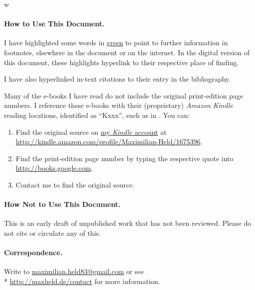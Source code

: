 w%
\paragraph{How to Use This Document.}
I have highlighted some words in \href{chap:how2}{green} to point to further information in footnotes, elsewhere in the document or on the internet.
In the digital version of this document, these highlights hyperlink to their respective place of finding.

I have also hyperlinked in-text citations to their entry in the bibliography.

Many of the e-books I have read do not include the original print-edition page numbers.
I reference these e-books with their (proprietary) \emph{Amazon Kindle \circledR} reading locations, identified as ``Kxxx'', such as in \citet[K50]{McCaffery2002}.
You can:

\begin{enumerate}
	\item Find the original source on \href{http://kindle.amazon.com/profile/Maximilian-Held/1675396}{my \emph{Kindle \circledR} account} at\\ \url{http://kindle.amazon.com/profile/Maximilian-Held/1675396}.

	\item Find the print-edition page number by typing the respective quote into \url{http://books.google.com}.

	\item Contact me to find the original source.
\end{enumerate}

\paragraph{How Not to Use This Document.}
This is an early draft of unpublished work that has not been reviewed. Please do not cite or circulate any of this.

\paragraph{Correspondence.}
Write to \href{mailto:maximilian.held83@gmail.com}{maximilian.held83@gmail.com} or see \\* \url{http://maxheld.de/contact} for more information.